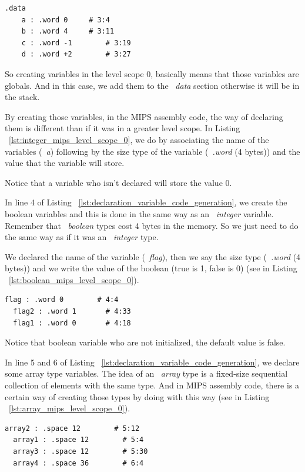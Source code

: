 \documentclass[
  oneside,
  11pt, a4paper,
  footinclude=true,
  headinclude=true,
  cleardoublepage=empty
]{scrbook}
\begin{document}
\begin{lstlisting}[caption={Code generation of integer variables in MIPS assembly code},label={lst:integer_mips_level_scope_0}]
  .data
	a : .word 0		# 3:4
	b : .word 4		# 3:11
	c : .word -1		# 3:19
	d : .word +2		# 3:27
\end{lstlisting}

So creating variables in the level scope 0, basically means that those variables are globals.
And in this case, we add them to the ~\textit{data} section otherwise it will be in the stack.

By creating those variables, in the MIPS assembly code, the way of declaring them is different than if it was in a greater level scope.
In Listing ~\ref{lst:integer_mips_level_scope_0}, we do by associating the name of the variables (~\textit{a}) following by the size type of the variable (~\textit{.word} (4 bytes)) and  the value that the variable will store.

Notice that a variable who isn't declared will store the value 0.

In line 4 of Listing ~\ref{lst:declaration_variable_code_generation}, we create the boolean variables and this is done in the same way as an ~\textit{integer} variable.
Remember that ~\textit{boolean} types cost 4 bytes in the memory. So we just need to do the same way as if it was an ~\textit{integer} type.

We declared the name of the variable (~\textit{flag}), then we say the size type (~\textit{.word} (4 bytes)) and we write the value of the boolean (true is 1, false is 0) (see in Listing ~\ref{lst:boolean_mips_level_scope_0}).

\begin{lstlisting}[caption={Code generation of boolean variables in MIPS assembly code},label={lst:boolean_mips_level_scope_0}]
  flag : .word 0		# 4:4
  flag2 : .word 1		# 4:33
  flag1 : .word 0		# 4:18
\end{lstlisting}

Notice that boolean variable who are not initialized, the default value is false.

In line 5 and 6 of Listing ~\ref{lst:declaration_variable_code_generation}, we declare some array type variables.
The idea of an ~\textit{array} type is a fixed-size sequential collection of elements with the same type. 
And in MIPS assembly code, there is a certain way of creating those types by doing with this way (see in Listing ~\ref{lst:array_mips_level_scope_0}).

\begin{lstlisting}[caption={Code generation of array variables in MIPS assembly code},label={lst:array_mips_level_scope_0}]
  array2 : .space 12		# 5:12
  array1 : .space 12		# 5:4
  array3 : .space 12		# 5:30
  array4 : .space 36		# 6:4
\end{lstlisting}
\end{document}
